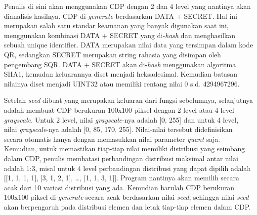 Penulis di sini akan menggunakan CDP dengan 2 dan 4 level yang nantinya akan dianalisis hasilnya. CDP di-\emph{generate} berdasarkan DATA + SECRET. Hal ini
merupakan salah satu standar keamanan yang banyak digunakan saat ini, menggunakan kombinasi DATA + SECRET yang di-\emph{hash} dan menghasilkan sebuah unique
identifier. DATA merupakan nilai data yang tersimpan dalam kode QR, sedangkan SECRET merupakan string rahasia yang disimpan oleh pengembang SQR. DATA + SECRET
akan di-\emph{hash} menggunakan algoritma SHA1, kemudan keluarannya diset menjadi heksadesimal. Kemudian batasan nilainya diset menjadi UINT32 atau memiliki
rentang nilai 0 s.d. 4294967296.

Setelah \emph{seed} dibuat yang merupakan keluaran dari fungsi sebelumnya, selanjutnya adalah membuat CDP berukuran 100x100 piksel dengan 2 level atau 4 level
\emph{grayscale}. Untuk 2 level, nilai \emph{grayscale}-nya adalah [0, 255] dan untuk 4 level, nilai \emph{grayscale}-nya adalah [0, 85, 170, 255]. Nilai-nilai
tersebut didefinisikan secara otomatis hanya dengan memasukkan nilai parameter \emph{quant} saja. Kemudian, untuk memastikan tiap-tiap nilai memiliki
distribusi yang seimbang dalam CDP, penulis membatasi perbandingan distribusi maksimal antar nilai adalah 1:3, misal untuk 4 level perbandingan distribusi yang
dapat dipilih adalah [[1, 1, 1, 1], [3, 1, 2, 1], …, [1, 1, 3, 1]]. Program nantinya akan memilih secara acak dari 10 variasi distribusi yang ada. Kemudian
barulah CDP berukuran 100x100 piksel di-\emph{generate} secara acak berdasarkan nilai \emph{seed}, sehingga nilai \emph{seed} akan berpengaruh pada distribusi
elemen dan letak tiap-tiap elemen dalam CDP.

